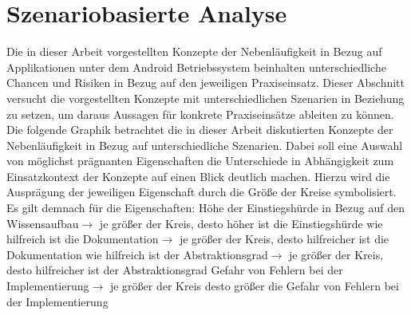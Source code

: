 \documentclass[12pt,oneside,a4paper,bibtotoc,liststotoc]{scrreprt}
\begin{document}
\section{Szenariobasierte Analyse}
Die in dieser Arbeit vorgestellten Konzepte der Nebenläufigkeit in Bezug auf Applikationen unter dem Android Betriebssystem beinhalten unterschiedliche Chancen und Risiken in Bezug auf den jeweiligen Praxiseinsatz. Dieser Abschnitt versucht die vorgestellten Konzepte mit unterschiedlichen Szenarien in Beziehung zu setzen, um daraus Aussagen für konkrete Praxiseinsätze ableiten zu können.\newline
Die folgende Graphik betrachtet die in dieser Arbeit diskutierten Konzepte der Nebenläufigkeit in Bezug auf unterschiedliche Szenarien. Dabei soll eine Auswahl von möglichst prägnanten Eigenschaften die Unterschiede in Abhängigkeit zum Einsatzkontext der Konzepte auf einen Blick deutlich machen. Hierzu wird die Ausprägung der jeweiligen Eigenschaft durch die Größe der Kreise symbolisiert. Es gilt demnach für die Eigenschaften:\newline \newline
\glqq Höhe der Einstiegshürde in Bezug auf den Wissensaufbau\grqq $\rightarrow$ je größer der Kreis, desto höher ist die Einstiegshürde \newline \newline
\glqq wie hilfreich ist die Dokumentation\grqq $\rightarrow$ je größer der Kreis, desto hilfreicher ist die Dokumentation\newline \newline
\glqq wie hilfreich ist der Abstraktionsgrad\grqq $\rightarrow$ je größer der Kreis, desto hilfreicher ist der Abstraktionsgrad\newline \newline
\glqq Gefahr von Fehlern bei der Implementierung\grqq $\rightarrow$ je größer der Kreis desto größer die Gefahr von Fehlern bei der Implementierung
\end{document}
